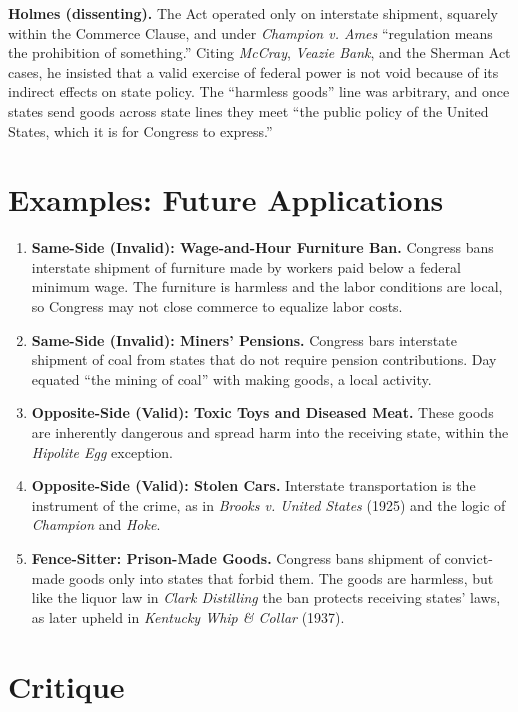 \documentclass[12pt]{article}
\begin{document}
\textbf{Holmes (dissenting).} The Act operated only on interstate shipment, squarely within the Commerce Clause, and under \textit{Champion v. Ames} ``regulation means the prohibition of something.'' Citing \textit{McCray}, \textit{Veazie Bank}, and the Sherman Act cases, he insisted that a valid exercise of federal power is not void because of its indirect effects on state policy. The ``harmless goods'' line was arbitrary, and once states send goods across state lines they meet ``the public policy of the United States, which it is for Congress to express.''

\section{Examples: Future Applications}

\begin{enumerate}
\item \textbf{Same-Side (Invalid): Wage-and-Hour Furniture Ban.} Congress bans interstate shipment of furniture made by workers paid below a federal minimum wage. The furniture is harmless and the labor conditions are local, so Congress may not close commerce to equalize labor costs.
\item \textbf{Same-Side (Invalid): Miners' Pensions.} Congress bars interstate shipment of coal from states that do not require pension contributions. Day equated ``the mining of coal'' with making goods, a local activity.
\item \textbf{Opposite-Side (Valid): Toxic Toys and Diseased Meat.} These goods are inherently dangerous and spread harm into the receiving state, within the \textit{Hipolite Egg} exception.
\item \textbf{Opposite-Side (Valid): Stolen Cars.} Interstate transportation is the instrument of the crime, as in \textit{Brooks v. United States} (1925) and the logic of \textit{Champion} and \textit{Hoke}.
\item \textbf{Fence-Sitter: Prison-Made Goods.} Congress bans shipment of convict-made goods only into states that forbid them. The goods are harmless, but like the liquor law in \textit{Clark Distilling} the ban protects receiving states' laws, as later upheld in \textit{Kentucky Whip \& Collar} (1937).
\end{enumerate}

\section{Critique}
\end{document}
